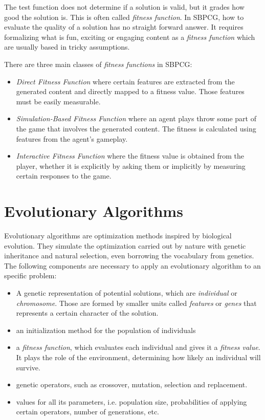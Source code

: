 The test function does not determine if a solution is valid, but it grades how good the solution is. This is often called \textit{fitness function}. In \ac{SBPCG}, how to evaluate the quality of a solution has no straight forward answer. It requires formalizing what is fun, exciting or engaging content  as a \textit{fitness function} which are usually based in tricky assumptions. 

There are three main classes of \textit{fitness functions} in \ac{SBPCG}\cite{togelius2010search}:

\begin{itemize}
	\item \textit{Direct Fitness Function} where certain features are extracted from the generated  content and directly mapped to a fitness value. Those features must be easily measurable.
	\item \textit{Simulation-Based Fitness Function} where an agent plays throw some part of the game that involves the generated content. The fitness is calculated using features from the agent's gameplay.
	\item \textit{Interactive Fitness Function} where the fitness value is obtained from the player, whether it is explicitly by asking them or implicitly by measuring certain responses to the game.
\end{itemize}


\section{Evolutionary Algorithms}

Evolutionary algorithms are optimization methods inspired by biological evolution. They simulate the optimization carried out by nature with genetic inheritance and natural selection, even borrowing the vocabulary from genetics. The following components are necessary to apply an evolutionary algorithm to an specific problem:
\begin{itemize}
	\item A genetic representation of potential solutions, which are \textit{individual} or \textit{chromosome}. Those are formed by smaller units called \textit{features} or \textit{genes} that represents a certain character of the solution.
	\item an initialization method for the population of individuals
	\item a \textit{fitness function}, which evaluates each individual and gives it a \textit{fitness value}. It plays the role of the environment, determining how likely an individual will survive.
	\item genetic operators, such as crossover, mutation, selection and replacement.
	\item values for all its parameters, i.e. population size, probabilities of applying certain operators, number of generations, etc.
\end{itemize}


